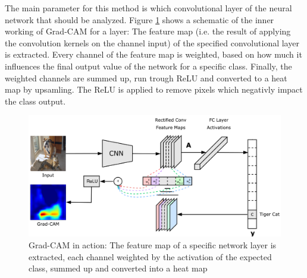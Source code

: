 The main parameter for this method is which convolutional layer of the neural network that should be analyzed. Figure \ref{grad_cam_explanation} shows a schematic of the inner working of Grad-CAM for a layer: The feature map (i.e. the result of applying the convolution kernels on the channel input) of the specified convolutional layer is extracted. Every channel of the feature map is weighted, based on how much it influences the final output value of the network for a specific class. Finally, the weighted channels are summed up, run trough ReLU and converted to a heat map by upsamling. The ReLU is applied to remove pixels which negativly impact the class output.

\begin{figure}[H]
\centering
\includegraphics[width=12cm]{chapters/02_methods/images/grad-cam.png}
\caption{Grad-CAM in action: The feature map of a specific network layer is extracted, each channel weighted by the activation of the expected class, summed up and converted into a heat map}
\label{grad_cam_explanation}
\end{figure}

